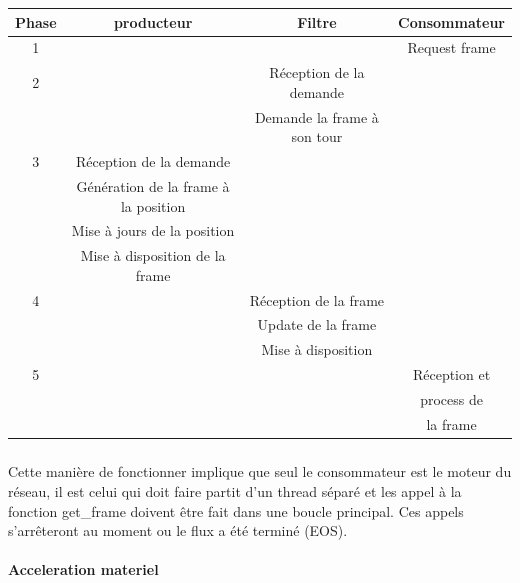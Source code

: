 \begin{center}

  \begin{tabular}{ | c | c | c | c |}

    \hline

Phase & producteur & Filtre & Consommateur    \\ \hline \hline

1 & & & Request frame   \\ \hline

2 & & Réception de la demande & \\

  & & Demande la frame à son tour & \\ \hline


3 & Réception de la demande & & \\

  & Génération de la frame à la position & & \\

  & Mise à jours de la position & & \\

  & Mise à disposition de la frame & & \\ \hline

4 & & Réception de la frame       & \\

  & & Update de la frame & \\

  & & Mise à disposition & \\ \hline

5 & & & Réception et    \\

  & & & process de      \\

  & & & la frame        \\ \hline

  \end{tabular}

\end{center}

\subparagraph{}

Cette manière de fonctionner implique que seul le consommateur est
le moteur du réseau, il est celui qui doit faire partit d'un thread
séparé et les appel à la fonction get\_frame doivent être fait dans
une boucle principal.  Ces appels s'arrêteront au moment ou le flux a
été terminé (EOS).


\paragraph{Acceleration materiel}

